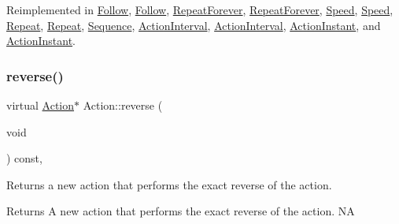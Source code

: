 Reimplemented in \hyperlink{classFollow_a643d457b3bd235733eb9ae63ef5ebc1f}{Follow}, \hyperlink{classFollow_a7b551b92d3313e4fe3aadbed45283911}{Follow}, \hyperlink{classRepeatForever_a5bae9a12b19d0c39d2a8a416bc68b1db}{Repeat\+Forever}, \hyperlink{classRepeatForever_a373f8961c015a1afa61c293ce787382c}{Repeat\+Forever}, \hyperlink{classSpeed_a6897f29e4fc1c8515fc12f9e98ebebef}{Speed}, \hyperlink{classSpeed_a6c357c4da932b6793c4626975546cb28}{Speed}, \hyperlink{classRepeat_a2efd4a590fb52dbc862b1e086509b87a}{Repeat}, \hyperlink{classRepeat_a01f8323eda5c46d6f103e8f8c5027f30}{Repeat}, \hyperlink{classSequence_a2f331fff9e2ab6e63569f55615a1c03e}{Sequence}, \hyperlink{classActionInterval_a2a62feefec443d8a99c644fd5f3a5d7e}{Action\+Interval}, \hyperlink{classActionInterval_a466ff6a3a5f95e47d4d01bfa4775290d}{Action\+Interval}, \hyperlink{classActionInstant_a9d54eff7c6e29764843fbbb965643643}{Action\+Instant}, and \hyperlink{classActionInstant_a3979d0556340173cdf58111665a96afd}{Action\+Instant}.

\mbox{\label{classAction_a2f06b574c4f066a3f11854a77c456227}} 
\subsubsection{\texorpdfstring{reverse()}{reverse()}\hspace{0.1cm}{\footnotesize\ttfamily [1/2]}}
{\footnotesize\ttfamily virtual \hyperlink{classAction}{Action}$\ast$ Action\+::reverse (\begin{DoxyParamCaption}\item[{void}]{ }\end{DoxyParamCaption}) const\hspace{0.3cm}{\ttfamily [inline]}, {\ttfamily [virtual]}}

Returns a new action that performs the exact reverse of the action.

\begin{DoxyReturn}{Returns}
A new action that performs the exact reverse of the action.  NA 
\end{DoxyReturn}


